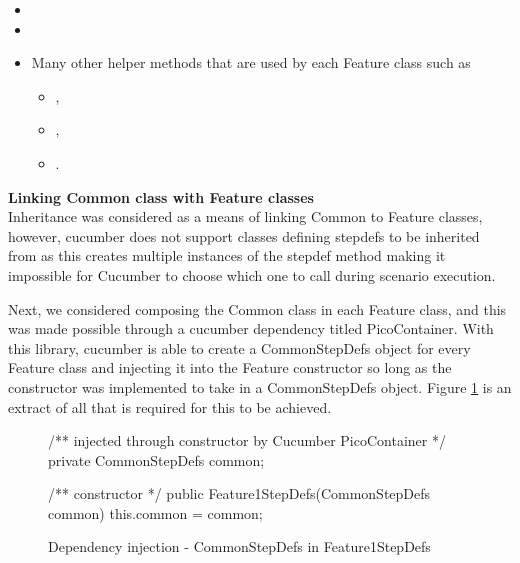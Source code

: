 \begin{itemize}
    \item {}
    \item {}
    \item Many other helper methods that are used by each Feature class such as 
    \begin{itemize}
        \item {}, 
        \item {}, 
        \item {}.
    \end{itemize}
\end{itemize}


\par
\textbf{Linking Common class with Feature classes\\}
Inheritance was considered as a means of linking Common to Feature classes, however, cucumber does not support classes defining stepdefs to be inherited from as this creates multiple instances of the stepdef method making it impossible for Cucumber to choose which one to call during scenario execution. 
\par 
Next, we considered composing the Common class in each Feature class, and this was made possible through a cucumber dependency titled PicoContainer. With this library, cucumber is able to create a CommonStepDefs object for every Feature class and injecting it into the Feature constructor so long as the constructor was implemented to take in a CommonStepDefs object. Figure \ref{code:cucumber-piccontainer-di} is an extract of all that is required for this to be achieved.

\begin{figure}[H]
\begin{javacode}
/** injected through constructor by Cucumber PicoContainer */
private CommonStepDefs common;

/** constructor */ 
public Feature1StepDefs(CommonStepDefs common) {
    this.common = common;
}
\end{javacode}
\caption{Dependency injection - CommonStepDefs in Feature1StepDefs}    
\label{code:cucumber-piccontainer-di}
\end{figure}
 
